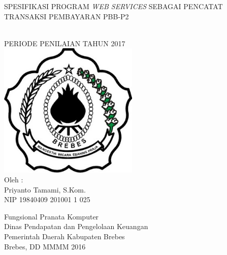 \begin{titlepage}

\begin{center}
{\large SPESIFIKASI PROGRAM \textit{WEB SERVICES} SEBAGAI PENCATAT TRANSAKSI PEMBAYARAN PBB-P2}

\HRule\\[1cm]

PERIODE PENILAIAN TAHUN 2017\\[1cm]

\includegraphics[width=0.5\textwidth]{./resources/logo}\\[1cm]

Oleh :\\
Priyanto Tamami, S.Kom.\\
NIP 19840409 201001 1 025\\


\vfill


Fungsional Pranata Komputer\\
Dinas Pendapatan dan Pengelolaan Keuangan\\
Pemerintah Daerah Kabupaten Brebes\\
Brebes, DD MMMM 2016
\end{center}

\end{titlepage}